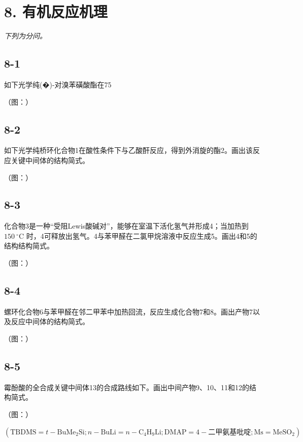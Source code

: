 \section*{8. 有机反应机理}
\textit{下列为分问。}

\subsection*{8-1}
如下光学纯(�)-对溴苯磺酸酯在75%

（图：）

\subsection*{8-2}
如下光学纯桥环化合物1在酸性条件下与⼄酸酐反应，得到外消旋的酯2。画出该反应关键中间体的结构简式。

（图：）

\subsection*{8-3}
化合物3是⼀种“受阻Lewis酸碱对”，能够在室温下活化氢⽓并形成4；当加热到 $1 5 0 ~ ^ { \circ } \mathrm { C }$ 时，4可释放出氢⽓。4与苯甲醛在⼆氯甲烷溶液中反应⽣成5。画出4和5的结构结构简式。

（图：）

\subsection*{8-4}
螺环化合物6与苯甲醛在邻⼆甲苯中加热回流，反应⽣成化合物7和8。画出产物7以及反应中间体的结构简式。

（图：）

\subsection*{8-5}
霉酚酸的全合成关键中间体13的合成路线如下。画出中间产物9、10、11和12的结构简式。

（图：）

$
\left(\mathrm{TBDMS} = t - \mathrm{BuMe} _ {2} \mathrm{Si}; n - \mathrm{BuLi} = n - \mathrm{C} _ {4} \mathrm{H} _ {9} \mathrm{Li}; \mathrm{DMAP} = 4 - \text {二甲氨基吡啶}; \mathrm{Ms} = \mathrm{MeSO} _ {2}\right)
$
